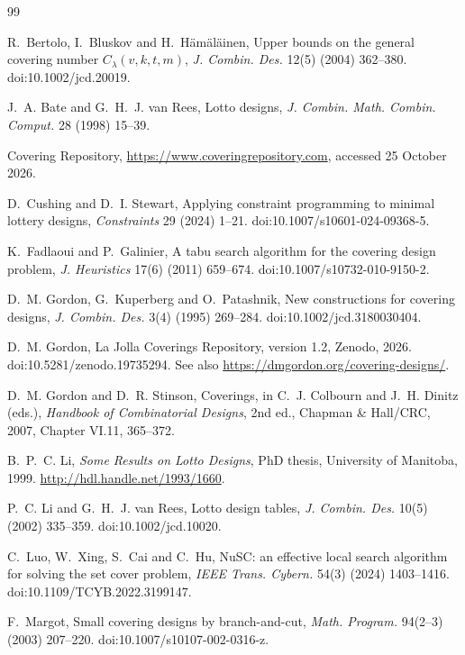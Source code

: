\documentclass[11pt]{article}
\theoremstyle{remark}
\begin{document}
\begin{thebibliography}{99}

 R.~Bertolo, I.~Bluskov and H.~H\"am\"al\"ainen, Upper bounds on the general covering number
$C_\lambda(v,k,t,m)$, \emph{J. Combin. Des.} 12(5) (2004) 362--380. doi:10.1002/jcd.20019.

 J.~A. Bate and G.~H.~J. van Rees, Lotto designs, \emph{J. Combin. Math. Combin. Comput.}
28 (1998) 15--39.

 Covering Repository, \url{https://www.coveringrepository.com}, accessed 25 October 2026.

 D.~Cushing and D.~I. Stewart, Applying constraint programming to minimal lottery designs,
\emph{Constraints} 29 (2024) 1--21. doi:10.1007/s10601-024-09368-5.

 K.~Fadlaoui and P.~Galinier, A tabu search algorithm for the covering design problem,
\emph{J. Heuristics} 17(6) (2011) 659--674. doi:10.1007/s10732-010-9150-2.

 D.~M. Gordon, G.~Kuperberg and O.~Patashnik, New constructions for covering designs,
\emph{J. Combin. Des.} 3(4) (1995) 269--284. doi:10.1002/jcd.3180030404.

 D.~M. Gordon, La Jolla Coverings Repository, version 1.2, Zenodo, 2026.
doi:10.5281/zenodo.19735294. See also \url{https://dmgordon.org/covering-designs/}.

 D.~M. Gordon and D.~R. Stinson, Coverings, in C.~J. Colbourn and J.~H. Dinitz (eds.),
\emph{Handbook of Combinatorial Designs}, 2nd ed., Chapman \& Hall/CRC, 2007, Chapter VI.11, 365--372.

 B.~P.~C. Li, \emph{Some Results on Lotto Designs}, PhD thesis, University of Manitoba, 1999.
\url{http://hdl.handle.net/1993/1660}.

 P.~C. Li and G.~H.~J. van Rees, Lotto design tables, \emph{J. Combin. Des.} 10(5) (2002)
335--359. doi:10.1002/jcd.10020.

 C.~Luo, W.~Xing, S.~Cai and C.~Hu, NuSC: an effective local search algorithm for solving the set
cover problem, \emph{IEEE Trans. Cybern.} 54(3) (2024) 1403--1416. doi:10.1109/TCYB.2022.3199147.

 F.~Margot, Small covering designs by branch-and-cut, \emph{Math. Program.} 94(2--3) (2003)
207--220. doi:10.1007/s10107-002-0316-z.


\end{thebibliography}
\end{document}

